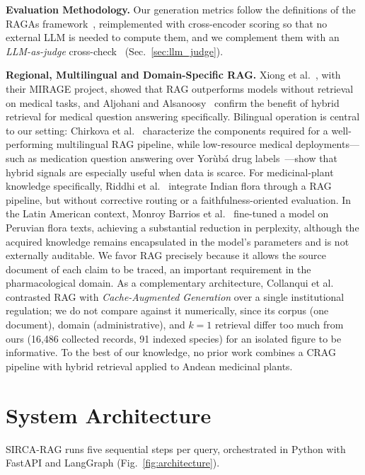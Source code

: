 \documentclass[runningheads]{llncs}
\newcommand{\sirca}{\textsc{SIRCA-RAG}}
\begin{document}
\textbf{Evaluation Methodology.} Our generation metrics follow the definitions of the RAGAs framework~\cite{es2023ragas}, reimplemented with cross-encoder scoring so that no external LLM is needed to compute them, and we complement them with an \emph{LLM-as-judge} cross-check~\cite{zheng2023mtbench} (Sec.~\ref{sec:llm_judge}).

\textbf{Regional, Multilingual and Domain-Specific RAG.} Xiong et al.~\cite{xiong2024mirage}, with their MIRAGE project, showed that RAG outperforms models without retrieval on medical tasks, and Aljohani and Alsanoosy~\cite{aljohani2026hybridmedical} confirm the benefit of hybrid retrieval for medical question answering specifically. Bilingual operation is central to our setting: Chirkova et al.~\cite{chirkova2024multilingual} characterize the components required for a well-performing multilingual RAG pipeline, while low-resource medical deployments---such as medication question answering over Yor\`ub\'a drug labels~\cite{adebesin2026yoruba}---show that hybrid signals are especially useful when data is scarce. For medicinal-plant knowledge specifically, Riddhi et al.~\cite{riddhi2025indianplants} integrate Indian flora through a RAG pipeline, but without corrective routing or a faithfulness-oriented evaluation. In the Latin American context, Monroy Barrios et al.~\cite{monroy2026finetuning} fine-tuned a model on Peruvian flora texts, achieving a substantial reduction in perplexity, although the acquired knowledge remains encapsulated in the model's parameters and is not externally auditable. We favor RAG precisely because it allows the source document of each claim to be traced, an important requirement in the pharmacological domain. As a complementary architecture, Collanqui et al.~\cite{collanqui2026cagrag} contrasted RAG with \emph{Cache-Augmented Generation} over a single institutional regulation; we do not compare against it numerically, since its corpus (one document), domain (administrative), and $k{=}1$ retrieval differ too much from ours (16,486 collected records, 91 indexed species) for an isolated figure to be informative. To the best of our knowledge, no prior work combines a CRAG pipeline with hybrid retrieval applied to Andean medicinal plants.

\section{System Architecture}
\label{sec:architecture}

\sirca{} runs five sequential steps per query, orchestrated in Python with FastAPI and LangGraph (Fig.~\ref{fig:architecture}).
\end{document}
